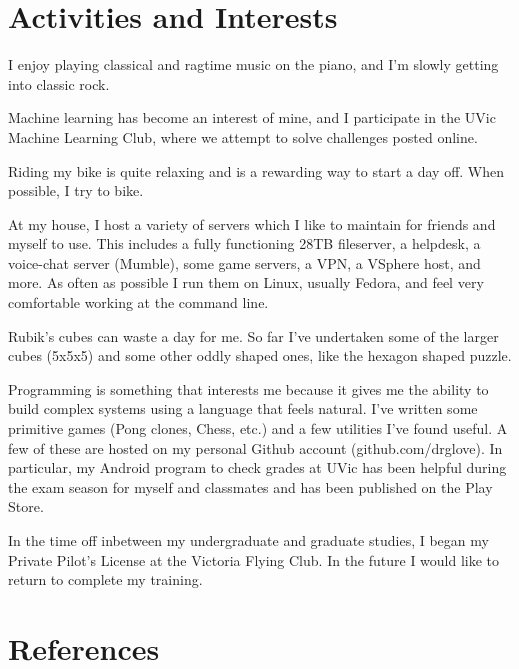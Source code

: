 \documentclass[margin,line]{resume}
\begin{document}
\begin{resume}
    \section{\mysidestyle Activities and Interests}
    \begin{list2}
    \item I enjoy playing classical and ragtime music on the piano, and I'm slowly getting into classic rock.
    \item Machine learning has become an interest of mine, and I participate in the UVic Machine Learning Club, where we attempt to solve challenges posted online.
    \item Riding my bike is quite relaxing and is a rewarding way to start a day off. When possible, I try to bike.
    \item At my house, I host a variety of servers which I like to maintain for friends and myself to use.
            This includes a fully functioning 28TB fileserver, a helpdesk, a voice-chat server (Mumble), some game servers, a VPN, a VSphere host, and more.
            As often as possible I run them on Linux, usually Fedora, and feel very comfortable working at the command line. 
    \item Rubik's cubes can waste a day for me. So far I've undertaken some of the larger cubes (5x5x5) and some other oddly shaped ones,
            like the hexagon shaped puzzle.
    \item Programming is something that interests me because it gives me the ability to build complex systems using a language that feels natural.
            I've written some primitive games (Pong clones, Chess, etc.) and a few utilities I've found useful.
            A few of these are hosted on my personal Github account (github.com/drglove).
            In particular, my Android program to check grades at UVic has been helpful during the exam season for myself and classmates and has been published on the Play Store.
    \item In the time off inbetween my undergraduate and graduate studies, I began my Private Pilot's License at the Victoria Flying Club. In the future I would like to return to complete my training.
    \end{list2}
    \vspace{2mm}

    \section{\mysidestyle References} 


\end{resume}
\end{document}
